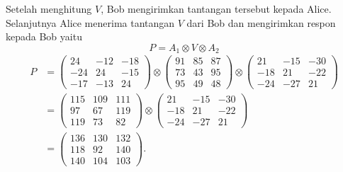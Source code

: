 \documentclass[aspectratio=169]{beamer}
\theoremstyle{definition}
\numberwithin{definisi}{section}
\begin{document}
\begin{frame}
  \frametitle{\insertsection}
  Setelah menghitung $V$, Bob mengirimkan tantangan tersebut kepada Alice.
  Selanjutnya Alice menerima tantangan $V$ dari Bob dan mengirimkan respon kepada Bob yaitu
  \[
    P = A_1 \otimes V \otimes A_2
  \]
  \begin{align*}
    P & =
    \begin{pmatrix}
      24  & -12 & -18 \\
      -24 & 24  & -15 \\
      -17 & -13 & 24
    \end{pmatrix}
    \otimes
    \begin{pmatrix}
      91 & 85 & 87 \\
      73 & 43 & 95 \\
      95 & 49 & 48
    \end{pmatrix}
    \otimes
    \begin{pmatrix}
      21  & -15 & -30 \\
      -18 & 21  & -22 \\
      -24 & -27 & 21
    \end{pmatrix} \\[1ex]
      & =
    \begin{pmatrix}
      115 & 109 & 111 \\
      97  & 67  & 119 \\
      119 & 73  & 82
    \end{pmatrix}
    \otimes
    \begin{pmatrix}
      21  & -15 & -30 \\
      -18 & 21  & -22 \\
      -24 & -27 & 21
    \end{pmatrix} \\[1ex]
      & =
    \begin{pmatrix}
      136 & 130 & 132 \\
      118 & 92  & 140 \\
      140 & 104 & 103
    \end{pmatrix}.
  \end{align*}
\end{frame}
\end{document}
